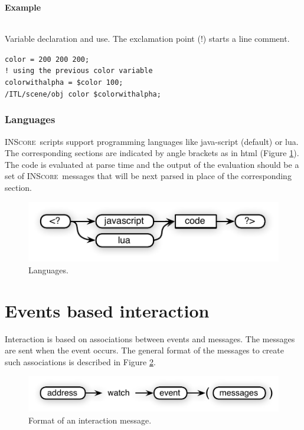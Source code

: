 \documentclass{article}
\newcommand{\inscore}		{\textsc{\small INScore}}
\newcounter{excount}
\newcommand{\exemple}			{\vspace{1mm} \hspace*{-4.5mm}\textbf{Example \arabic{excount}} \addtocounter{excount}{1}}
\newcommand{\sample}	[1]		{\begin{center}\colorbox{mygrey}{
								\begin{minipage}[t]{0.95\columnwidth} 
								{\small \texttt{#1}}
								\end{minipage}}\end{center}}
\begin{document}
\exemple \\
Variable declaration and use. The exclamation point (!) starts a line comment.
\vspace{-1mm}\sample{color = 200 200 200; \\
! using the previous color variable\\
colorwithalpha = \$color 100;  \\
/ITL/scene/obj color \$colorwithalpha;
 }

\subsubsection{Languages}

\inscore\ scripts support programming languages like java-script (default) or lua. The corresponding sections are indicated by angle brackets as in html (Figure \ref{fig:lang}). The code is evaluated at parse time and the output of the evaluation should be a set of \inscore\ messages that will be next parsed in place of the corresponding section.

\begin{figure}[htbp]
\centerline{
	\includegraphics[width=0.8\columnwidth]{imgs/scripts}}
\caption{Languages.}
\label{fig:lang}
\end{figure}

\section{Events based interaction}\label{sec:interaction}

Interaction is based on associations between events and messages. The messages are sent when the event occurs. The general format of the messages to create such associations is described in Figure \ref{fig:watch}.

\begin{figure}[htbp]
\centerline{
	\includegraphics[width=0.95\columnwidth]{imgs/watch}}
\caption{Format of an interaction message.}
\label{fig:watch}
\end{figure}
\end{document}
